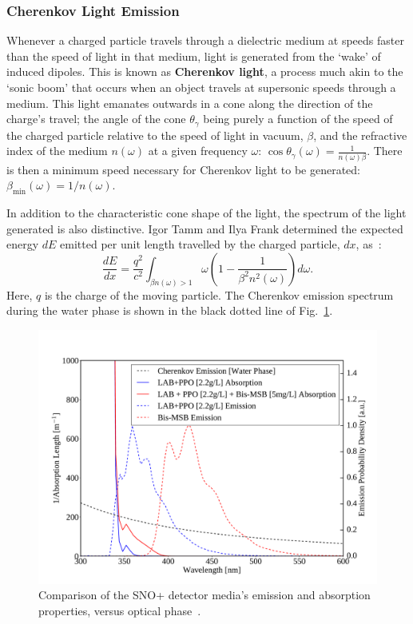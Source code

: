 \subsubsection{Cherenkov Light Emission}
Whenever a charged particle travels through a dielectric medium at speeds faster than the speed of light in that medium, light is generated from the `wake' of induced dipoles. This is known as \textbf{Cherenkov light}, a process much akin to the `sonic boom' that occurs when an object travels at supersonic speeds through a medium. This light emanates outwards in a cone along the direction of the charge's travel; the angle of the cone $\theta_{\gamma}$ being purely a function of the speed of the charged particle relative to the speed of light in vacuum, $\beta$, and the refractive index of the medium $n(\omega)$ at a given frequency $\omega$: $\cos{\theta_{\gamma}}(\omega) = \frac{1}{n(\omega)\beta}$. There is then a minimum speed necessary for Cherenkov light to be generated: $\beta_{\textrm{min}}(\omega) = 1/n(\omega)$.

In addition to the characteristic cone shape of the light, the spectrum of the light generated is also distinctive. Igor Tamm and Ilya Frank determined the expected energy $dE$ emitted per unit length travelled by the charged particle, $dx$, as~\cite{frankCoherentVisibleRadiation1937}: %
\begin{equation}
    \frac{dE}{dx} = 
    \frac{q^2}{c^{2}}\int_{\beta n(\omega)>1}\omega\left(1-\frac{1}{\beta^{2}n^{2}(\omega)}\right)d\omega.
\end{equation}
Here, $q$ is the charge of the moving particle. The Cherenkov emission spectrum during the water phase is shown in the black dotted line of Fig.~\ref{fig:cherenkov_scintillator_abs_emit_dist}.

\begin{figure}
    \centering
    \includegraphics[width=0.8\linewidth]{2_Detector/Figs/scint_lengths_LABPPOBisMSB_plot_nice.pdf}
    \caption[Comparison of the SNO+ detector media's emission properties, versus optical phase]
    {Comparison of the SNO+ detector media's emission and absorption properties, versus optical phase~\cite{kaptanogluOpticsOverviewProposed2016,kaptanogluDocumentationAttenuationStudies2022}. %
    }
    \label{fig:cherenkov_scintillator_abs_emit_dist}
\end{figure}

